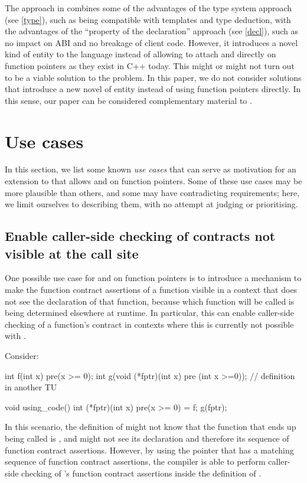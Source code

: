 The approach in \cite{P3271R0} combines some of the advantages of the type system approach (see \ref{type}), such as being compatible with templates and type deduction, with the advantages of the ``property of the declaration'' approach (see \ref{decl}), such as no impact on ABI and no breakage of client code. However, it introduces a novel kind of entity to the language instead of allowing to attach  and  directly on function pointers as they exist in C++ today. This might or might not turn out to be a viable solution to the problem. In this paper, we do not consider solutions that introduce a new novel of entity instead of using function pointers directly. In this sense, our paper can be considered complementary material to \cite{P3271R0}.

\section{Use cases}
\label{usecases}

In this section, we list some known \emph{use cases} that can serve as motivation for an extension to \cite{P2900R8} that allows  and  on function pointers. Some of these use cases may be more plausible than others, and some may have contradicting requirements; here, we limit ourselves to describing them, with no attempt at judging or prioritising.

\subsection{Enable caller-side checking of contracts not visible at the call site}
\label{usecase_ville}

One possible use case for  and  on function pointers is to introduce a mechanism to make the function contract assertions of a function visible in a context that does not see the declaration of that function, because which function will be called is being determined elsewhere at runtime. In particular, this can enable caller-side checking of a function's contract in contexts where this is currently not possible with \cite{P2900R8}.

Consider:
\begin{codeblock}
int f(int x) pre(x >= 0);
int g(void (*fptr)(int x) pre (int x >=0)); // definition in another TU

void using_code() {
  int (*fptr)(int x) pre(x >= 0) = f;
  g(fptr);
}
\end{codeblock}
In this scenario, the definition of  might not know that the function that ends up being called is , and might not see its declaration and therefore its sequence of function contract assertions. However, by using the pointer  that has a matching sequence of function contract assertions, the compiler is able to perform caller-side checking of 's function contract assertions inside the definition of .

